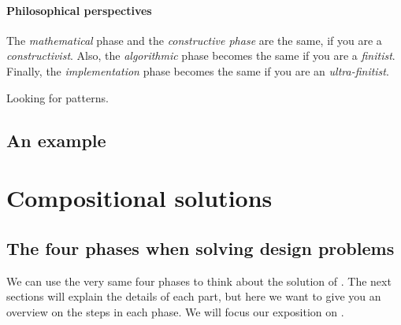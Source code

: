 \paragraph*{Philosophical perspectives}
The \emph{mathematical} phase and the \emph{constructive phase} are the same, if you are a \emph{constructivist}.
Also, the \emph{algorithmic} phase becomes the same if you are a \emph{finitist}.
Finally, the \emph{implementation} phase becomes the same if you are an \emph{ultra-finitist}.

\devel{
    }

Looking for patterns.

\devel{
    

    }

\subsection{An example}

\publictodomessage

\section{Compositional solutions}

\publictodomessage

\subsection{The four phases when solving  design problems}
We can use the very same four phases to think about the solution of .
The next sections will explain the details of each part, but here we want to give you an overview on the steps in each phase.
We will focus our exposition on \FixFunMinRes.

